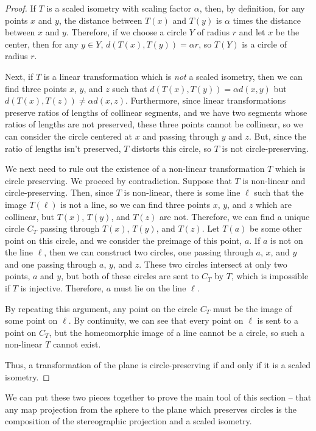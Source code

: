 {\begin{proof}
If $T$ is a scaled isometry with scaling factor $\alpha$, then, by definition, for any points $x$ and $y$, the distance between $T(x)$ and $T(y)$ is $\alpha$ times the distance between $x$ and $y$.  Therefore, if we choose a circle $Y$ of radius $r$ and let $x$ be the center, then for any $y\in Y$, $d(T(x),T(y)) = \alpha r$, so $T(Y)$ is a circle of radius $r$.

Next, if $T$ is a linear transformation which is \textit{not} a scaled isometry, then we can find three points $x$, $y$, and $z$ such that $d(T(x),T(y)) = \alpha d(x,y)$ but $d(T(x),T(z)) \neq \alpha d(x,z)$.  Furthermore, since linear transformations preserve ratios of lengths of collinear segments, and we have two segments whose ratios of lengths are not preserved, these three points cannot be collinear, so we can consider the circle centered at $x$ and passing through $y$ and $z$.  But, since the ratio of lengths isn't preserved, $T$ distorts this circle, so $T$ is not circle-preserving.

We next need to rule out the existence of a non-linear transformation $T$ which is circle preserving.  We proceed by contradiction.  Suppose that $T$ is non-linear and circle-preserving.  Then, since $T$ is non-linear, there is some line $\ell$ such that the image $T(\ell)$ is not a line, so we can find three points $x$, $y$, and $z$ which are collinear, but $T(x)$, $T(y)$, and $T(z)$ are not.  Therefore, we can find a unique circle $C_T$ passing through $T(x)$, $T(y)$, and $T(z)$.  Let $T(a)$ be some other point on this circle, and we consider the preimage of this point, $a$.  If $a$ is not on the line $\ell$, then we can construct two circles, one passing through $a$, $x$, and $y$ and one passing through $a$, $y$, and $z$.  These two circles intersect at only two points, $a$ and $y$, but both of these circles are sent to $C_T$ by $T$, which is impossible if $T$ is injective.  Therefore, $a$ must lie on the line $\ell$.

By repeating this argument, any point on the circle $C_T$ must be the image of some point on $\ell$.  By continuity, we can see that every point on $\ell$ is sent to a point on $C_T$, but the homeomorphic image of a line cannot be a circle, so such a non-linear $T$ cannot exist.

Thus, a transformation of the plane is circle-preserving if and only if it is a scaled isometry.


\end{proof}

We can put these two pieces together to prove the main tool of this section -- that any map projection from the sphere to the plane which preserves circles is the composition of the stereographic projection and a scaled isometry.

}
